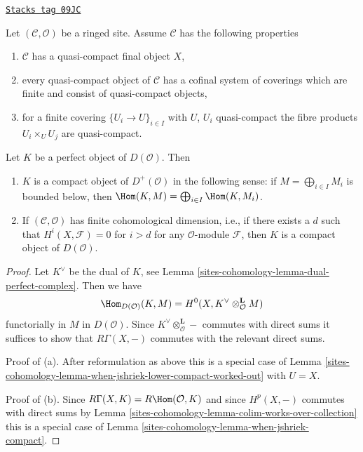 \begin{lemma}
\label{sites-cohomology-lemma-perfect-is-compact}
\href{https://stacks.math.columbia.edu/tag/09JC}{\texttt{Stacks tag 09JC}}

Let $(\mathcal{C}, \mathcal{O})$ be a ringed site. Assume
$\mathcal{C}$ has the following properties
\begin{enumerate}
\item $\mathcal{C}$ has a quasi-compact final object $X$,
\item every quasi-compact object of $\mathcal{C}$
has a cofinal system of coverings which are finite
and consist of quasi-compact objects,
\item for a finite covering $\{U_i \to U\}_{i \in I}$
with $U$, $U_i$ quasi-compact the fibre products $U_i \times_U U_j$ are
quasi-compact.
\end{enumerate}
Let $K$ be a perfect object of $D(\mathcal{O})$. Then
\begin{enumerate}
\item[(a)] $K$ is a compact object of $D^+(\mathcal{O})$
in the following sense: if $M = \bigoplus_{i \in I} M_i$ is
bounded below, then $\Hom(K, M) = \bigoplus_{i \in I} \Hom(K, M_i)$.
\item[(b)] If $(\mathcal{C}, \mathcal{O})$
has finite cohomological dimension, i.e., if there exists
a $d$ such that $H^i(X, \mathcal{F}) = 0$ for $i > d$ for
any $\mathcal{O}$-module $\mathcal{F}$, then
$K$ is a compact object of $D(\mathcal{O})$.
\end{enumerate}
\end{lemma}

\begin{proof}
Let $K^\vee$ be the dual of $K$, see
Lemma \ref{sites-cohomology-lemma-dual-perfect-complex}. Then we have
$$
\Hom_{D(\mathcal{O})}(K, M) =
H^0(X, K^\vee \otimes_\mathcal{O}^\mathbf{L} M)
$$
functorially in $M$ in $D(\mathcal{O})$.
Since $K^\vee \otimes_\mathcal{O}^\mathbf{L} -$ commutes with
direct sums it suffices
to show that $R\Gamma(X, -)$ commutes with the relevant direct sums.

\medskip\noindent
Proof of (a). After reformulation as above this is a special
case of Lemma \ref{sites-cohomology-lemma-when-jshriek-lower-compact-worked-out} with $U = X$.

\medskip\noindent
Proof of (b). Since $R\Gamma(X, K) = R\Hom(\mathcal{O}, K)$
and since $H^p(X, -)$ commutes with direct sums by
Lemma \ref{sites-cohomology-lemma-colim-works-over-collection}
this is a special case of
Lemma \ref{sites-cohomology-lemma-when-jshriek-compact}.
\end{proof}

